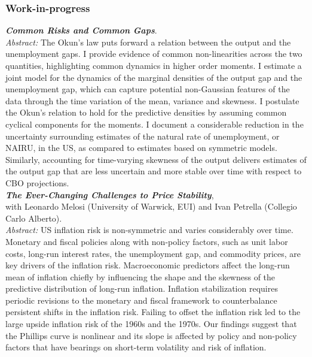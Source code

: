 \documentclass[a4paper,12pt]{article}
\begin{document}
\subsubsection*{Work-in-progress}
\textit{\textbf{Common Risks and Common Gaps}}.\\[.2em]
\textit{Abstract:} The Okun's law puts forward a relation between the output and the unemployment gaps. I provide evidence of common non-linearities across the two quantities, highlighting common dynamics in higher order moments. I estimate a joint model for the dynamics of the marginal densities of the output gap and the unemployment gap, which can capture potential non-Gaussian features of the data through the time variation of the mean, variance and skewness. I postulate the Okun's relation to hold for the predictive densities by assuming common cyclical components for the moments. I document a considerable reduction in the uncertainty surrounding estimates of the natural rate of unemployment, or NAIRU, in the US, as compared to estimates based on symmetric models. Similarly, accounting for time-varying skewness of the output delivers estimates of the output gap that are less uncertain and more stable over time with respect to CBO projections.\\[.5em]

\textit{\textbf{The Ever-Changing Challenges to Price Stability}},\\with Leonardo Melosi (University of Warwick, EUI) and Ivan Petrella (Collegio Carlo Alberto).\\[.2em]
\textit{Abstract:} US inflation risk is non-symmetric and varies considerably over time. Monetary and fiscal policies along with non-policy factors, such as unit labor costs, long-run interest rates, the unemployment gap, and commodity prices, are key drivers of the inflation risk. Macroeconomic predictors affect the long-run mean of inflation chiefly by influencing the shape and the skewness of the predictive distribution of long-run inflation. Inflation stabilization requires periodic revisions to the monetary and fiscal framework to counterbalance persistent shifts in the inflation risk. Failing to offset the inflation risk led to the large upside inflation risk of the 1960s and the 1970s. Our findings suggest that the Phillips curve is nonlinear and its slope is affected by policy and non-policy factors that have bearings on short-term volatility and risk of inflation.\\[.5em]
\end{document}
